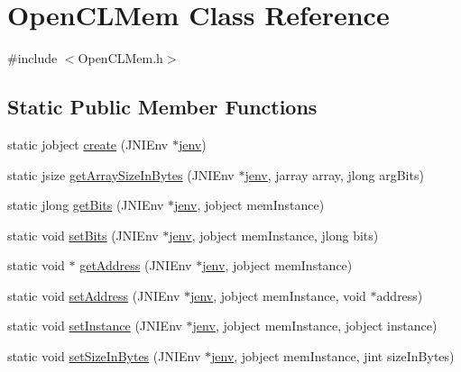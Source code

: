 \hypertarget{class_open_c_l_mem}{\section{Open\-C\-L\-Mem Class Reference}
\label{class_open_c_l_mem}
}


{\ttfamily \#include $<$Open\-C\-L\-Mem.\-h$>$}

\subsection*{Static Public Member Functions}
\begin{DoxyCompactItemize}
\item 
static jobject \hyperlink{class_open_c_l_mem_a2fe75bec65fef0e519a0ece50aacb708}{create} (J\-N\-I\-Env $\ast$\hyperlink{aparapi_8cpp_a31595c73e9a3750524b2ff61b5a14f96}{jenv})
\item 
static jsize \hyperlink{class_open_c_l_mem_a08cb904658d8d1cb7b1ef26ed0fa12bb}{get\-Array\-Size\-In\-Bytes} (J\-N\-I\-Env $\ast$\hyperlink{aparapi_8cpp_a31595c73e9a3750524b2ff61b5a14f96}{jenv}, jarray array, jlong arg\-Bits)
\item 
static jlong \hyperlink{class_open_c_l_mem_aa31b83df24a508db60aaba597517466c}{get\-Bits} (J\-N\-I\-Env $\ast$\hyperlink{aparapi_8cpp_a31595c73e9a3750524b2ff61b5a14f96}{jenv}, jobject mem\-Instance)
\item 
static void \hyperlink{class_open_c_l_mem_a4d3c619a77472507a46486af0eeff741}{set\-Bits} (J\-N\-I\-Env $\ast$\hyperlink{aparapi_8cpp_a31595c73e9a3750524b2ff61b5a14f96}{jenv}, jobject mem\-Instance, jlong bits)
\item 
static void $\ast$ \hyperlink{class_open_c_l_mem_ab53d59b56ff112d7975b9c9c5cd54a41}{get\-Address} (J\-N\-I\-Env $\ast$\hyperlink{aparapi_8cpp_a31595c73e9a3750524b2ff61b5a14f96}{jenv}, jobject mem\-Instance)
\item 
static void \hyperlink{class_open_c_l_mem_aa784f759739667fd0e0dd9a7786014bb}{set\-Address} (J\-N\-I\-Env $\ast$\hyperlink{aparapi_8cpp_a31595c73e9a3750524b2ff61b5a14f96}{jenv}, jobject mem\-Instance, void $\ast$address)
\item 
static void \hyperlink{class_open_c_l_mem_aa63aa9894ea6aef68f3bb603ac4ced37}{set\-Instance} (J\-N\-I\-Env $\ast$\hyperlink{aparapi_8cpp_a31595c73e9a3750524b2ff61b5a14f96}{jenv}, jobject mem\-Instance, jobject instance)
\item 
static void \hyperlink{class_open_c_l_mem_ae405cb58c87ccf9e3ecf452c521c5eb1}{set\-Size\-In\-Bytes} (J\-N\-I\-Env $\ast$\hyperlink{aparapi_8cpp_a31595c73e9a3750524b2ff61b5a14f96}{jenv}, jobject mem\-Instance, jint size\-In\-Bytes)

\end{DoxyCompactItemize}
